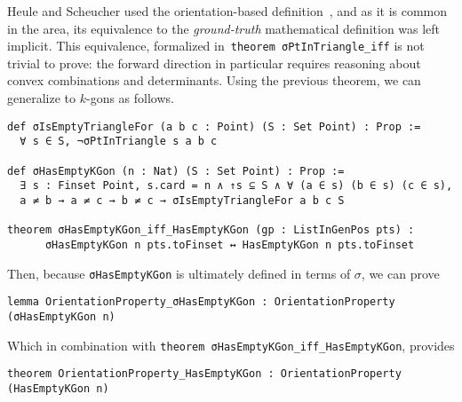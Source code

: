 



Heule and Scheucher used the orientation-based definition~\cite{emptyHexagonNumber}, and as it is common in the area, its equivalence to the \emph{ground-truth} mathematical definition was left implicit.
This equivalence, formalized in~\lstinline|theorem σPtInTriangle_iff| is not trivial to prove:
the forward direction in particular requires reasoning about convex combinations and determinants.
Using the previous theorem, we can generalize to $k$-gons as follows.
\begin{lstlisting}
def σIsEmptyTriangleFor (a b c : Point) (S : Set Point) : Prop :=
  ∀ s ∈ S, ¬σPtInTriangle s a b c

def σHasEmptyKGon (n : Nat) (S : Set Point) : Prop :=
  ∃ s : Finset Point, s.card = n ∧ ↑s ⊆ S ∧ ∀ (a ∈ s) (b ∈ s) (c ∈ s), 
  a ≠ b → a ≠ c → b ≠ c → σIsEmptyTriangleFor a b c S

theorem σHasEmptyKGon_iff_HasEmptyKGon (gp : ListInGenPos pts) :
      σHasEmptyKGon n pts.toFinset ↔ HasEmptyKGon n pts.toFinset
\end{lstlisting}

Then, because \lstinline|σHasEmptyKGon| is ultimately defined in terms of $\sigma$, we can prove
\begin{lstlisting}
lemma OrientationProperty_σHasEmptyKGon : OrientationProperty (σHasEmptyKGon n)
\end{lstlisting}
Which in combination with \lstinline|theorem σHasEmptyKGon_iff_HasEmptyKGon|, provides
\begin{lstlisting}
theorem OrientationProperty_HasEmptyKGon : OrientationProperty (HasEmptyKGon n)
\end{lstlisting}

